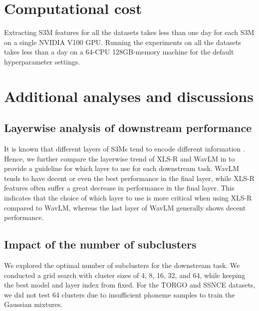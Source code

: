 \section{Computational cost}
Extracting S3M features for all the datasets takes less than one day for each S3M on a single NVIDIA V100 GPU.
Running the experiments on all the datasets takes less than a day on a 64-CPU 128GB-memory machine for the default hyperparameter settings.


\section{Additional analyses and discussions}\label{sec:add-analysis}

\subsection{Layerwise analysis of downstream performance}\label{subsec:layerwise}

It is known that different layers of S3Ms tend to encode different information \citep{pasad2021layer,pasad2023self,pasad2023comparative,choi2024self}.
Hence, we further compare the layerwise trend of XLS-R and WavLM in  to provide a guideline for which layer to use for each downstream task.
WavLM tends to have decent or even the best performance in the final layer, while XLS-R features often suffer a great decrease in performance in the final layer.
This indicates that the choice of which layer to use is more critical when using XLS-R compared to WavLM, whereas the last layer of WavLM generally shows decent performance.


\subsection{Impact of the number of subclusters}\label{subsec:abl-clusters}

We explored the optimal number of subclusters for the downstream task.
We conducted a grid search with cluster sizes of 4, 8, 16, 32, and 64, while keeping the best model and layer index from  fixed.
For the TORGO and SSNCE datasets, we did not test 64 clusters due to insufficient phoneme samples to train the Gaussian mixtures.

